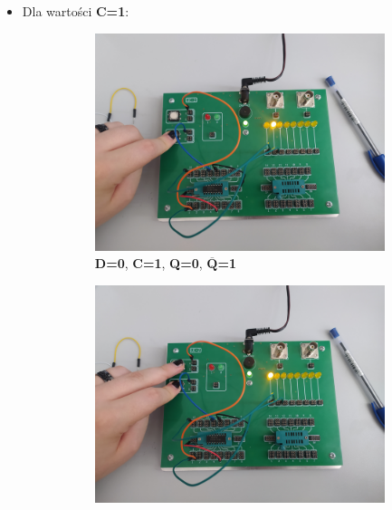 \begin{itemize}
\pagebreak
        
    \item Dla wartości \textbf{C=1}:
        \begin{figure}[H]
            \centering
            \begin{subfigure}[H]{0.48\textwidth}
                \includegraphics[width=\textwidth]{img/5_4/1653500524989_scaled.png}
                \caption*{\textbf{D=0}, \textbf{C=1}, \textbf{Q=0}, $\overline{\textbf{Q}}$\textbf{=1}}
            \end{subfigure}
            \begin{subfigure}[H]{0.48\textwidth}
                \includegraphics[width=\textwidth]{img/5_4/1653500524969_scaled.png}

\end{subfigure}
\end{figure}
\end{itemize}

